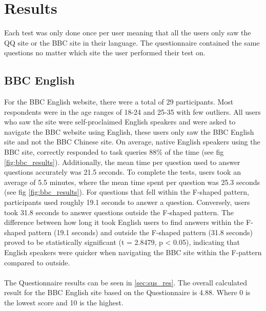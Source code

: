 
\chapter{Results} %

\label{Chapter8} %

Each test was only done once per user meaning that all the users only saw the QQ site or the BBC site in their language. The questionnaire contained the same questions no matter which site the user performed their test on.

\section{BBC English}
For the BBC English website, there were a total of 29 participants. Most respondents were in the age ranges of 18-24 and 25-35 with few outliers. All users who saw the site were self-proclaimed English speakers and were asked to navigate the BBC website using English, these users only saw the BBC English site and not the BBC Chinese site. On average, native English speakers using the BBC site, correctly responded to task queries 88\% of the time (see fig \ref{fig:bbc_results}). Additionally, the mean time per question used to answer questions accurately was 21.5 seconds. To complete the tests, users took an average of 5.5 minutes, where the mean time spent per question was 25.3 seconds (see fig \ref{fig:bbc_results}). For questions that fell within the F-shaped pattern, participants used roughly 19.1 seconds to answer a question. Conversely, users took 31.8 seconds to answer questions outside the F-shaped pattern. The difference between how long it took English users to find answers within the F-shaped pattern (19.1 seconds) and outside the F-shaped pattern (31.8 seconds) proved to be statistically significant (t = 2.8479, p < 0.05), indicating that English speakers were quicker when navigating the BBC site within the F-pattern compared to outside. 
\\\\
The Questionnaire results can be seen in \ref{sec:sus_res}. The overall calculated result for the BBC English site based on the Questionnaire is 4.88. Where 0 is the lowest score and 10 is the highest.

